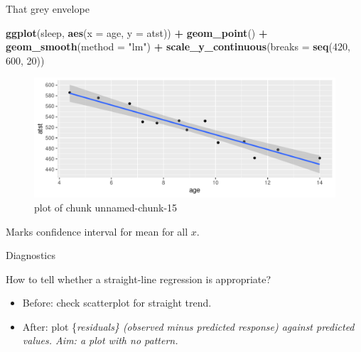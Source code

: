 \documentclass[ignorenonframetext,]{beamer}
\newenvironment{Shaded}{\begin{snugshade}}{\end{snugshade}}
\newcommand{\DataTypeTok}[1]{\textcolor[rgb]{0.13,0.29,0.53}{#1}}
\newcommand{\DecValTok}[1]{\textcolor[rgb]{0.00,0.00,0.81}{#1}}
\newcommand{\KeywordTok}[1]{\textcolor[rgb]{0.13,0.29,0.53}{\textbf{#1}}}
\newcommand{\NormalTok}[1]{#1}
\newcommand{\OperatorTok}[1]{\textcolor[rgb]{0.81,0.36,0.00}{\textbf{#1}}}
\newcommand{\StringTok}[1]{\textcolor[rgb]{0.31,0.60,0.02}{#1}}
\begin{document}
\begin{frame}[fragile]{That grey envelope}
\protect\hypertarget{that-grey-envelope}{}

\begin{Shaded}
\begin{Highlighting}[]
\KeywordTok{ggplot}\NormalTok{(sleep, }\KeywordTok{aes}\NormalTok{(}\DataTypeTok{x =}\NormalTok{ age, }\DataTypeTok{y =}\NormalTok{ atst)) }\OperatorTok{+}\StringTok{ }\KeywordTok{geom_point}\NormalTok{() }\OperatorTok{+}
\StringTok{  }\KeywordTok{geom_smooth}\NormalTok{(}\DataTypeTok{method =} \StringTok{"lm"}\NormalTok{) }\OperatorTok{+}
\StringTok{  }\KeywordTok{scale_y_continuous}\NormalTok{(}\DataTypeTok{breaks =} \KeywordTok{seq}\NormalTok{(}\DecValTok{420}\NormalTok{, }\DecValTok{600}\NormalTok{, }\DecValTok{20}\NormalTok{))}
\end{Highlighting}
\end{Shaded}

\begin{figure}
\centering
\includegraphics{figure/unnamed-chunk-15-1.pdf}
\caption{plot of chunk unnamed-chunk-15}
\end{figure}

Marks confidence interval for mean for all \(x\).

\end{frame}

\begin{frame}{Diagnostics}
\protect\hypertarget{diagnostics}{}

How to tell whether a straight-line regression is appropriate?

\vspace{3ex}

\begin{itemize}
\item
  Before: check scatterplot for straight trend.
\item
  After: plot \{\em residuals\} (observed minus predicted response)
  against predicted values. Aim: a plot with no pattern.
\end{itemize}

\vspace{3ex}

\end{frame}
\end{document}
